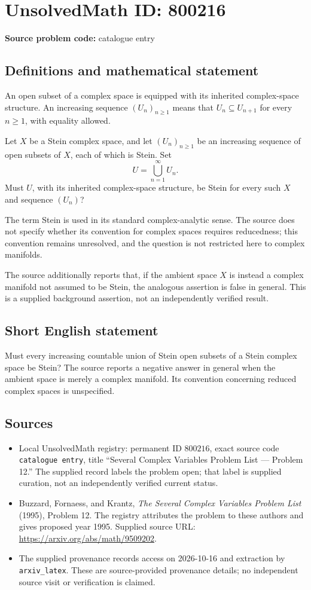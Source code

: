 \documentclass[11pt]{article}
\begin{document}
\section*{UnsolvedMath ID: 800216}
\textbf{Source problem code:} catalogue entry
\subsection{Definitions and mathematical statement}
An open subset of a complex space is equipped with its inherited complex-space structure. An increasing sequence \((U_n)_{n\geq 1}\) means that \(U_n\subseteq U_{n+1}\) for every \(n\geq 1\), with equality allowed.

Let \(X\) be a Stein complex space, and let \((U_n)_{n\geq 1}\) be an increasing sequence of open subsets of \(X\), each of which is Stein. Set
\[
U=\bigcup_{n=1}^{\infty}U_n.
\]
Must \(U\), with its inherited complex-space structure, be Stein for every such \(X\) and sequence \((U_n)\)?

The term Stein is used in its standard complex-analytic sense. The source does not specify whether its convention for complex spaces requires reducedness; this convention remains unresolved, and the question is not restricted here to complex manifolds.

The source additionally reports that, if the ambient space \(X\) is instead a complex manifold not assumed to be Stein, the analogous assertion is false in general. This is a supplied background assertion, not an independently verified result.
\subsection{Short English statement}
Must every increasing countable union of Stein open subsets of a Stein complex space be Stein? The source reports a negative answer in general when the ambient space is merely a complex manifold. Its convention concerning reduced complex spaces is unspecified.
\subsection{Sources}
\begin{itemize}
\item Local UnsolvedMath registry: permanent ID \(800216\), exact source code \texttt{catalogue entry}, title ``Several Complex Variables Problem List --- Problem 12.'' The supplied record labels the problem open; that label is supplied curation, not an independently verified current status.
\item Buzzard, Fornaess, and Krantz, \emph{The Several Complex Variables Problem List} (1995), Problem 12. The registry attributes the problem to these authors and gives proposed year 1995. Supplied source URL: \url{https://arxiv.org/abs/math/9509202}.
\item The supplied provenance records access on 2026-10-16 and extraction by \texttt{arxiv\_latex}. These are source-provided provenance details; no independent source visit or verification is claimed.
\end{itemize}
\end{document}
